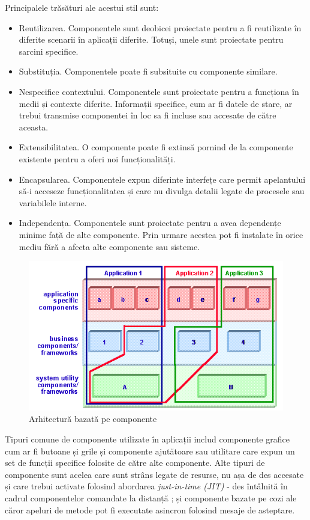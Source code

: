 \documentclass[12pt, a4paper, oneside, romanian]{teza-upb}
\begin{document}
Principalele trăsături ale acestui stil sunt:
\begin{itemize}
 \item Reutilizarea. Componentele sunt deobicei proiectate pentru a fi reutilizate în diferite scenarii în aplicații diferite. Totuși, unele sunt proiectate pentru sarcini specifice.
 \item Substituția. Componentele poate fi subsituite cu componente similare. 
 \item Nespecifice contextului. Componentele sunt proiectate pentru a funcționa în medii și contexte diferite. Informații specifice, cum ar fi datele de stare, ar trebui transmise componentei în loc sa fi incluse sau accesate de către aceasta.
 \item Extensibilitatea. O componente poate fi extinsă pornind de la componente existente pentru a oferi noi funcționalități.
 \item Encapsularea. Componentele expun diferinte interfețe care permit apelantului să-i acceseze funcționalitatea și care nu divulga detalii legate de procesele sau variabilele interne.
 \item Independența. Componentele sunt proiectate pentru a avea dependențe minime față de alte componente. Prin urmare acestea pot fi instalate în orice mediu fără a afecta alte componente sau sisteme.
\end{itemize}

\begin{figure}[ht]
\centering
\includegraphics*[scale=0.8]{img/component-based.png}
\caption{Arhitectură bazată pe componente}
\label{fig:arhi_componente}
\end{figure}
Tipuri comune de componente utilizate în aplicații includ componente grafice cum ar fi butoane și grile și componente ajutătoare sau utilitare care expun un set de funcții specifice folosite de către alte componente. Alte tipuri de componente sunt acelea care sunt strâns legate de resurse, nu așa de des accesate și care trebui activate folosind abordarea \emph{just-in-time (JIT)} - des întâlnită în cadrul componentelor comandate la distanță ; și componente bazate pe cozi ale căror apeluri de metode pot fi executate asincron folosind mesaje de asteptare.
\end{document}
